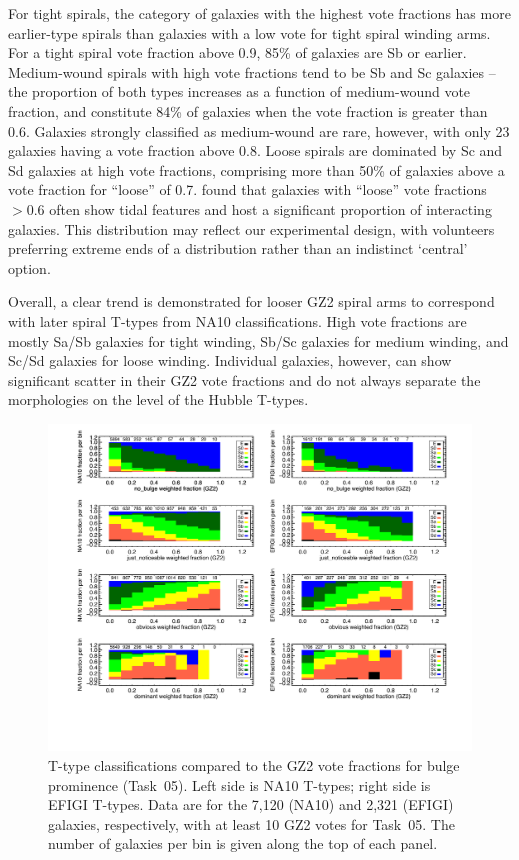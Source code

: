\documentclass[useAMS,usenatbib]{mn2e}
\begin{document}
For tight spirals, the category of galaxies with the highest vote fractions has more earlier-type spirals than galaxies with a low vote for tight spiral winding arms. For a tight spiral vote fraction above 0.9, 85\% of galaxies are Sb or earlier. Medium-wound spirals with high vote fractions tend to be Sb and Sc galaxies -- the proportion of both types increases as a function of medium-wound vote fraction, and constitute 84\% of galaxies when the vote fraction is greater than 0.6. Galaxies strongly classified as medium-wound are rare, however, with only 23 galaxies having a vote fraction above 0.8.  Loose spirals are dominated by Sc and Sd galaxies at high vote fractions, comprising more than 50\% of galaxies above a vote fraction for ``loose'' of 0.7. \citet{cas13} found that galaxies with ``loose'' vote fractions $>0.6$ often show tidal features and host a significant proportion of interacting galaxies. This distribution may reflect our experimental design, with volunteers preferring extreme ends of a distribution rather than an indistinct `central' option. 

Overall, a clear trend is demonstrated for looser GZ2 spiral arms to correspond with later spiral T-types from NA10 classifications. High vote fractions are mostly Sa/Sb galaxies for tight winding, Sb/Sc galaxies for medium winding, and Sc/Sd galaxies for loose winding. Individual galaxies, however, can show significant scatter in their GZ2 vote fractions and do not always separate the morphologies on the level of the Hubble T-types. 

\begin{figure}
\includegraphics[angle=0,width=7.0in]{figures/bulgeprominence_color.pdf}
\caption{T-type classifications compared to the GZ2 vote fractions for bulge prominence (Task~05). Left side is NA10 T-types; right side is EFIGI T-types. Data are for the 7,120 (NA10) and 2,321 (EFIGI) galaxies, respectively, with at least 10 GZ2 votes for Task~05. The number of galaxies per bin is given along the top of each panel. 
\label{fig-bulgeprominence}}
\end{figure}
\end{document}
